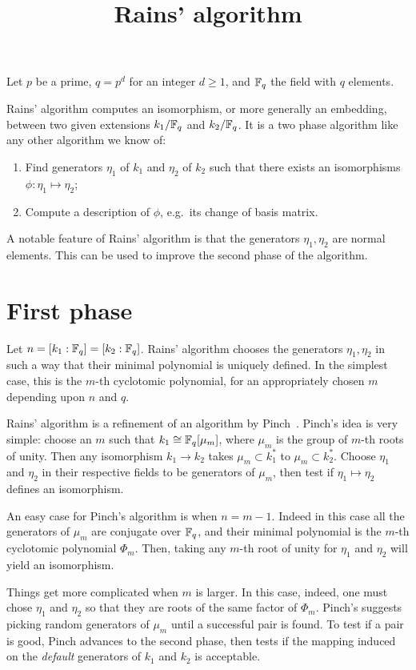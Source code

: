 \documentclass{article}
\title{Rains' algorithm}
\begin{document}
\maketitle

Let $p$ be a prime, $q=p^d$ for an integer $d\ge1$, and $\mathbb{F}_q$ the
field with $q$ elements.

Rains' algorithm computes an isomorphism, or more generally an
embedding, between two given extensions $k_1/\mathbb{F}_q$ and $k_2/\mathbb{F}_q$. It
is a two phase algorithm like any other algorithm we know of:
\begin{enumerate}
\item Find generators $\eta_1$ of $k_1$ and $\eta_2$ of $k_2$ such
that there exists an isomorphisms $\phi:\eta_1\mapsto\eta_2$;
\item Compute a description of $\phi$, e.g.\ its change of basis
matrix.
\end{enumerate}

A notable feature of Rains' algorithm is that the generators
$\eta_1,\eta_2$ are normal elements. This can be used to improve the
second phase of the algorithm.

\section{First phase}

Let $n=[k_1:\mathbb{F}_q]=[k_2:\mathbb{F}_q]$. Rains' algorithm chooses the generators
$\eta_1,\eta_2$ in such a way that their minimal polynomial is
uniquely defined. In the simplest case, this is the $m$-th cyclotomic
polynomial, for an appropriately chosen $m$ depending upon $n$ and
$q$.

Rains' algorithm is a refinement of an algorithm by
Pinch~\cite{todo}. Pinch's idea is very simple: choose an $m$ such
that $k_1\cong\mathbb{F}_q[\mu_m]$, where $\mu_m$ is the group of $m$-th roots
of unity. Then any isomorphism $k_1\to k_2$ takes $\mu_m\subset
k_1^\ast$ to $\mu_m\subset k_2^\ast$. Choose $\eta_1$ and $\eta_2$ in
their respective fields to be generators of $\mu_m$, then test if
$\eta_1\mapsto\eta_2$ defines an isomorphism.

An easy case for Pinch's algorithm is when $n=m-1$. Indeed in this
case all the generators of $\mu_m$ are conjugate over $\mathbb{F}_q$, and
their minimal polynomial is the $m$-th cyclotomic polynomial
$\Phi_m$. Then, taking any $m$-th root of unity for $\eta_1$ and
$\eta_2$ will yield an isomorphism.

Things get more complicated when $m$ is larger. In this case, indeed,
one must chose $\eta_1$ and $\eta_2$ so that they are roots of the
same factor of $\Phi_m$. Pinch's suggests picking random generators of
$\mu_m$ until a successful pair is found. To test if a pair is good,
Pinch advances to the second phase, then tests if the mapping induced
on the \emph{default} generators of $k_1$ and $k_2$ is acceptable.
\end{document}
